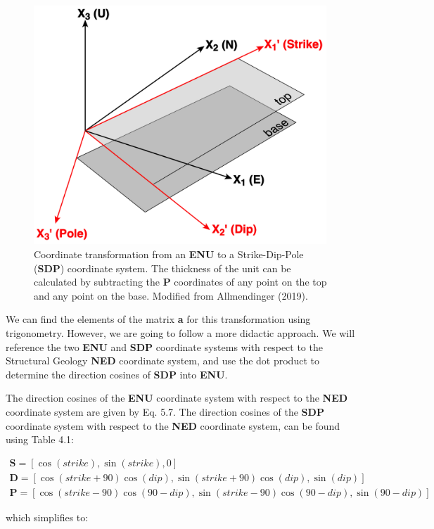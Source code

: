 \documentclass[a4paper , 12pt]{book}
\begin{document}
 \begin{figure}[H]
    \centering
    \includegraphics[width=11cm]{Figures/ch5f3.png}
    \caption{Coordinate transformation from an \textbf{ENU} to a Strike-Dip-Pole (\textbf{SDP}) coordinate system. The thickness of the unit can be calculated by subtracting the \textbf{P} coordinates of any point on the top and any point on the base. Modified from Allmendinger (2019).}
\end{figure}

We can find the elements of the matrix \textbf{a} for this transformation using trigonometry. However, we are going to follow a more didactic approach. We will reference the two \textbf{ENU} and \textbf{SDP} coordinate systems with respect to the Structural Geology \textbf{NED} coordinate system, and use the dot product to determine the direction cosines of \textbf{SDP} into \textbf{ENU}. 

The direction cosines of the \textbf{ENU} coordinate system with respect to the \textbf{NED} coordinate system are given by Eq. 5.7. The direction cosines of the \textbf{SDP} coordinate system with respect to the \textbf{NED} coordinate system, can be found using Table 4.1:

\begin{gather*}
    \mathbf{S} = [\cos(strike),\sin(strike),0] \\
    \mathbf{D} = [\cos(strike+90)\cos(dip),\sin(strike+90)\cos(dip),\sin(dip)] \\
    \mathbf{P} = [\cos(strike-90)\cos(90-dip),\sin(strike-90)\cos(90-dip),\sin(90-dip)]
\end{gather*}

which simplifies to:
\end{document}
